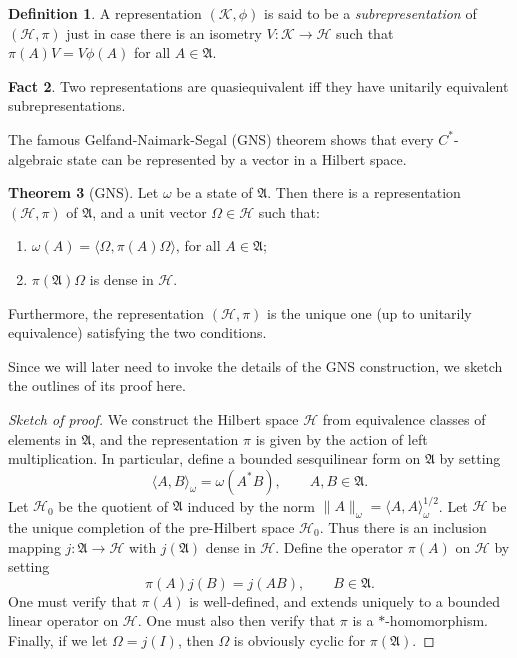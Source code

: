 \documentclass[11pt]{article}
\newcommand{\alg}[1]{\mathfrak{#1}}
\newcommand{\norm}[1]{\| #1\|}
\theoremstyle{definition}
\newtheorem{thm}{Theorem}[section]
\newtheorem{fact}[thm]{Fact}
\theoremstyle{definition}
\newtheorem{defn}[thm]{Definition}
\theoremstyle{remark}
\def\2#1{{\mathcal #1}}
\def\al#1{{\mathfrak #1}}
\def\om{\omega} \def\Om{\Omega} \def\dd{\partial} \def\D{\Delta}
\begin{document}
\begin{defn} A representation $(\2K ,\phi )$ is said to be a
  \emph{subrepresentation} of $(\2H ,\pi )$ just in case there is an
  isometry $V:\2K \to \2H$ such that $\pi (A)V=V\phi (A)$ for all
  $A\in \al A$.
\end{defn}

\begin{fact} Two representations are quasiequivalent iff they have
  unitarily equivalent subrepresentations.  \end{fact}

The famous Gelfand-Naimark-Segal (GNS) theorem shows that every
$C^*$-algebraic state can be represented by a vector in a Hilbert
space.

\begin{thm}[GNS] Let $\om$ be a state of $\alg{A}$.  Then there is a
  representation $(\2H ,\pi )$ of $\alg{A}$, and a unit vector $\Om
  \in \2H$ such that:
  \begin{enumerate}
  \item $\om (A)=\langle \Om ,\pi (A)\Om \rangle$, for all $A\in
    \alg{A}$;
  \item $\pi (\alg{A})\Om$ is dense in $\2H$.
  \end{enumerate}
  Furthermore, the representation $(\2H ,\pi )$ is the unique one (up
  to unitarily equivalence) satisfying the two conditions.  \label{gns}
\end{thm}

Since we will later need to invoke the details of the GNS
construction, we sketch the outlines of its proof here.

\begin{proof}[Sketch of proof] We construct the Hilbert space $\2H$
  from equivalence classes of elements in $\al A$, and the
  representation $\pi$ is given by the action of left multiplication.
  In particular, define a bounded sesquilinear form on $\al A$ by
  setting
$$ \langle A,B\rangle _\om = \om (A^*B ),\qquad A,B\in \al A .$$
Let $\2H _0$ be the quotient of $\al A$ induced by the norm
$\norm{A}_{\om}=\langle A,A\rangle _{\om}^{1/2}$.  Let $\2H$ be the
unique completion of the pre-Hilbert space $\2H _0$.  Thus there is an
inclusion mapping $j:\al A\to \2H$ with $j(\al A)$ dense in $\2H$.
Define the operator $\pi (A)$ on $\2H$ by setting
$$ \pi (A)j(B) = j(AB) ,\qquad B\in \al A .$$
One must verify that $\pi (A)$ is well-defined, and extends uniquely
to a bounded linear operator on $\2H$.  One must also then verify that
$\pi$ is a $*$-homomorphism.  Finally, if we let $\Om =j(I)$, then
$\Om$ is obviously cyclic for $\pi (\alg{A})$.
\end{proof}
\end{document}

